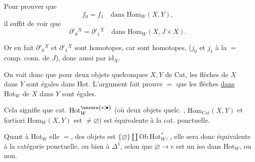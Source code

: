 
Pour prouver que
\[
 f_0=f_1\quad\text{dans }\mathrm{Hom}_W(X,Y),
\]
il suffit de voir que 
\[
 \partial'_0{}^X=\partial'_1{}^X\quad\text{dans }\mathrm{Hom}_W(X,J\times X).
\]

Or en fait $\partial'_0{}^X$ et $\partial'_1{}^X$ sont homotopes, car
sont homotopes,  ($j_0$ et $j_1$  à la $=$ comp. conn. de $J$), donc aussi  par $\mathrm{id}_X$.

On voit donc que pour deux objets quelconques $X,Y$ de  $\mathrm{Cat}$,  les flèches de $X$ dans $Y$ sont égales dans $\mathrm{Hot}$. L'argument fait prouve $=$ que  les flèches \uline{dans $\mathrm{Hot}_W$} de $X$ dans $Y$ sont égales.

Cela signifie que  cat. $\mathrm{Hot}^{\unsure{*|\bullet}}_W$ (où  deux objets quelc. ,  $\mathrm{Hom}_{\mathrm{Cat}}(X,Y)$ et  fortiori $\mathrm{Hom}_W(X,Y)$ est $\ne\varnothing$) est équivalente à la cat. ponctuelle.

Quant à $\mathrm{Hot}_W$ elle $=$,  des objets est $\{\varnothing\}\amalg\mathrm{Ob}\,\mathrm{Hot}^{*}_W$, , elle sera donc équivalente à la catégorie ponctuelle, ou bien à $\Delta^1$, selon que $\varnothing\to e$ est un iso dans $\mathrm{Hot}_W$, ou non.
